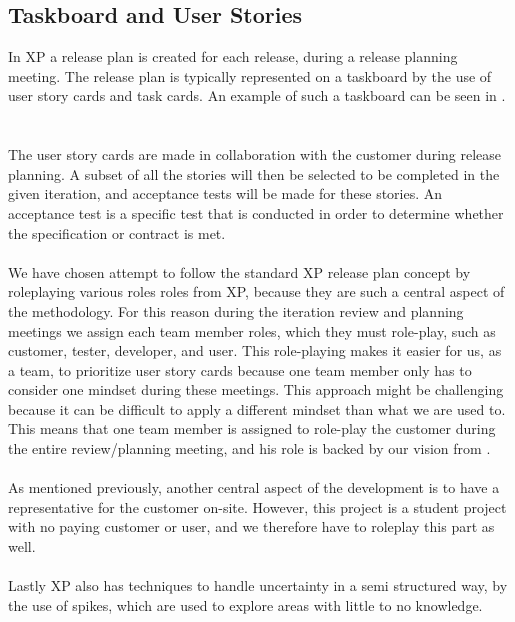 \subsection{Taskboard and User Stories}
\label{sub:taskboard_and_user_stories}
In XP a release plan is created for each release, during a release planning meeting. The release plan is typically represented on a taskboard by the use of user story cards and task cards. An example of such a taskboard can be seen in \figref{}.
~
\\\\
The user story cards are made in collaboration with the customer during release planning.  A subset of all the stories will then be selected to be completed in the given iteration, and acceptance tests will be made for these stories. An acceptance test is a specific test that is conducted in order to determine whether the specification or contract is met.
\\\\
We have chosen attempt to follow the standard XP release plan concept by roleplaying various roles roles from XP, because they are such a central aspect of the methodology. For this reason during the iteration review and planning meetings we assign each team member roles, which they must role-play, such as customer, tester, developer, and user. This role-playing makes it easier for us, as a team, to prioritize user story cards because one team member only has to consider one mindset during these meetings. This approach might be challenging because it can be difficult to apply a different mindset than what we are used to. This means that one team member is assigned to role-play the customer during the entire review/planning meeting, and his role is backed by our vision from  .
\\\\
As mentioned previously, another central aspect of the development is to have a representative for the customer on-site. However, this project is a student project with no paying customer or user, and we therefore have to roleplay this part as well. 
\\\\
Lastly XP also has techniques to handle uncertainty in a semi structured way, by the use of spikes, which are used to explore areas with little to no knowledge. 

